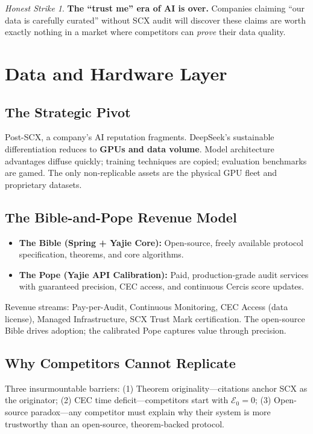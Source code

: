 \documentclass[12pt,a4paper]{article}
\theoremstyle{remark}
\newtheorem{honesthit}{Honest Strike}[section]
\newenvironment{hitbox}{%
  \begin{center}\color{red}\begin{minipage}{0.92\textwidth}\begin{honesthit}}{%
  \end{honesthit}\end{minipage}\end{center}}
\begin{document}
\begin{hitbox}
\textbf{The ``trust me'' era of AI is over.} Companies claiming ``our data is carefully curated'' without SCX audit will discover these claims are worth exactly nothing in a market where competitors can \textit{prove} their data quality.
\end{hitbox}
\section{Data and Hardware Layer}
\subsection{The Strategic Pivot}
Post-SCX, a company's AI reputation fragments. DeepSeek's sustainable differentiation reduces to \textbf{GPUs and data volume}. Model architecture advantages diffuse quickly; training techniques are copied; evaluation benchmarks are gamed. The only non-replicable assets are the physical GPU fleet and proprietary datasets.

\subsection{The Bible-and-Pope Revenue Model}
\begin{itemize}
    \item \textbf{The Bible (Spring + Yajie Core):} Open-source, freely available protocol specification, theorems, and core algorithms.
    \item \textbf{The Pope (Yajie API Calibration):} Paid, production-grade audit services with guaranteed precision, CEC access, and continuous Cercis score updates.
\end{itemize}

Revenue streams: Pay-per-Audit, Continuous Monitoring, CEC Access (data license), Managed Infrastructure, SCX Trust Mark certification. The open-source Bible drives adoption; the calibrated Pope captures value through precision.

\subsection{Why Competitors Cannot Replicate}
Three insurmountable barriers: (1) Theorem originality---citations anchor SCX as the originator; (2) CEC time deficit---competitors start with \(\mathcal{E}_0 = 0\); (3) Open-source paradox---any competitor must explain why their system is more trustworthy than an open-source, theorem-backed protocol.
\end{document}
